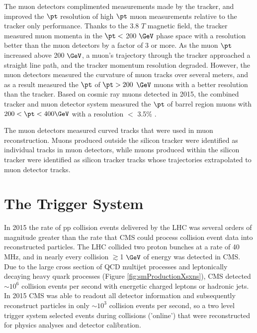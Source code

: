 The muon detectors complimented measurements made by the tracker, and improved the $\pt$ resolution of high $\pt$ muon 
measurements relative to the tracker only performance.  Thanks to the 3.8 $\unit{T}$ magnetic field, the tracker measured 
muon momenta in the $\pt <$ 200 $\GeV$ phase space with a resolution better than the muon detectors by a factor of 3 or 
more.  As the muon $\pt$ increased above 200 $\GeV$, a muon's trajectory through the tracker approached a straight line path, 
and the tracker momentum resolution degraded.  However, the muon detectors measured the curvature of muon tracks over several 
meters, and as a result measured the $\pt$ of $\pt > 200$ $\GeV$ muons with a better resolution than the tracker.  Based on 
cosmic ray muons detected in 2015, the combined tracker and muon detector system measured the $\pt$ of barrel region muons 
with $200 < \pt < 400 \GeV$ with a resolution $<$ 3.5\% \cite{cmsMuonRecoRunTwo}.

The muon detectors measured curved tracks that were used in muon reconstruction.  Muons produced outside the silicon tracker 
were identified as individual tracks in muon detectors, while muons produced within the silicon tracker were identified 
as silicon tracker tracks whose trajectories extrapolated to muon detector tracks.


\section{The Trigger System}
\label{sec:triggerDescription}
In 2015 the rate of pp collision events delivered by the LHC was several orders of magnitude greater than the 
rate that CMS could process collision event data into reconstructed particles.  The LHC collided two proton bunches 
at a rate of 40 MHz, and in nearly every collision $\gtrsim$1 $\GeV$ of energy was detected in CMS.  Due to the large cross 
section of QCD multijet processes and leptonically decaying heavy quark processes (Figure \ref{fig:smProductionXsxns}), CMS 
detected $\sim10^{6}$ collision events per second with energetic charged leptons or hadronic jets.  In 2015 
CMS was able to readout all detector information and subsequently reconstruct particles in only $\sim10^{3}$ 
collision events per second, so a two level trigger 
system selected events during collisions ('online') that were reconstructed for physics analyses and detector calibration.

